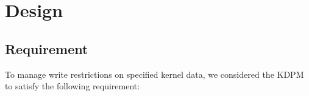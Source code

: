 \section{Design} \label{section:approach}

\subsection{Requirement} \label{subsection:design}

To manage write restrictions on specified kernel data, 
we considered the KDPM to satisfy the following requirement: 


